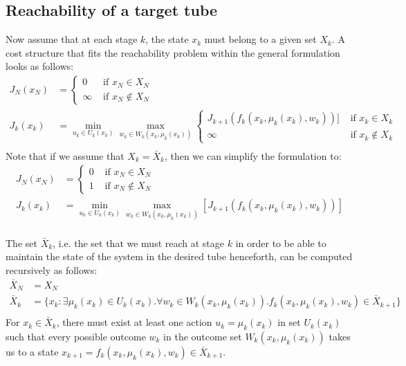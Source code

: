 \documentclass[11pt, oneside]{article}   	%
\begin{document}
\subsection{Reachability of a target tube}
Now assume that at each stage $k$, the state $x_k$ must belong to a given set $X_k$. A cost structure that fits the reachability problem within the general formulation looks as follows:
\begin{align*}
J_{N}(x_{N}) &=
\begin{cases}
0 & \text{ if } x_N \in X_N\\
\infty & \text{ if } x_N \not\in X_N
\end{cases}\\
J_{k}(x_{k}) &= \min_{u_k \in U_k(x_k)} \max_{w_k \in W_k(x_k,\mu_k(x_k))}
\begin{cases}
J_{k+1}(f_k(x_k,\mu_k(x_k),w_k))] & \text{ if } x_k \in X_k\\
\infty & \text{ if } x_k \not\in X_k
\end{cases}\\
\end{align*}
Note that if we assume that $X_k = \bar{X}_k$, then we can simplify the formulation to:
\begin{align*}
J_{N}(x_{N}) &=
\begin{cases}
0 & \text{ if } x_N \in X_N\\
1 & \text{ if } x_N \not\in X_N
\end{cases}\\
J_{k}(x_{k}) &= \min_{u_k \in U_k(x_k)} \max_{w_k \in W_k(x_k,\mu_k(x_k))} \left[ J_{k+1}(f_k(x_k,\mu_k(x_k),w_k))\right]\\
\end{align*}

The set $\bar{X}_k$, i.e. the set that we must reach at stage $k$ in order to be able to maintain the state of the system in the desired tube henceforth, can be computed recursively as follows:
\begin{align*}
\bar{X}_N &= X_N\\
\bar{X}_k &= \{x_k: \exists \mu_k(x_k) \in U_k(x_k).\forall w_k\in W_k(x_k,\mu_k(x_k)).f_k(x_k,\mu_k(x_k),w_k) \in \bar{X}_{k+1}\}\\
\end{align*}
For $x_k \in \bar{X}_k$, there must exist at least one action $u_k=\mu_k(x_k)$ in set $U_k(x_k)$ such that every possible outcome $w_k$ in the outcome set $W_k(x_k,\mu_k(x_k))$ takes us to a state $x_{k+1} = f_k(x_k,\mu_k(x_k),w_k) \in \bar{X}_{k+1}$.
\end{document}
